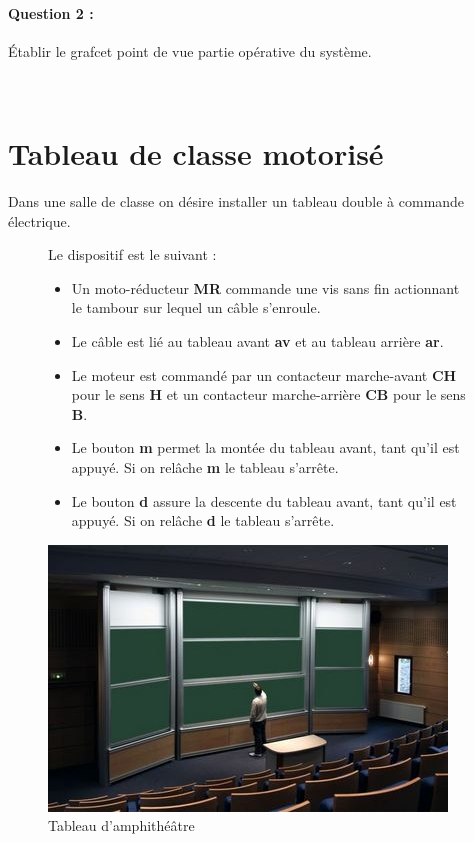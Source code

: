 \paragraph{Question 2 :} Établir le grafcet point de vue partie opérative du système.

\newpage

~\

\newpage

\section{Tableau de classe motorisé}

Dans une salle de classe on désire installer un tableau double à commande électrique.

\begin{figure}[!h]
\begin{minipage}{0.55\linewidth}
Le dispositif est le suivant :
\begin{itemize}
 \item Un moto-réducteur \textbf{MR} commande une vis sans fin actionnant le tambour sur lequel un câble s'enroule.
 \item Le câble est lié au tableau avant \textbf{av} et au tableau arrière \textbf{ar}.
 \item Le moteur est commandé par un contacteur marche-avant \textbf{CH} pour le sens \textbf{H} et un contacteur marche-arrière \textbf{CB} pour le sens \textbf{B}.
 \item Le bouton \textbf{m} permet la montée du tableau avant, tant qu'il est appuyé. Si on relâche \textbf{m} le tableau s'arrête.
 \item Le bouton \textbf{d} assure la descente du tableau avant, tant qu'il est appuyé. Si on relâche \textbf{d} le tableau s'arrête.
\end{itemize}
\end{minipage}
\hfill
\begin{minipage}{0.4\linewidth}
 \begin{center}
 \includegraphics[width=1\linewidth]{img/Tableau.jpg}
 \end{center}
 \caption{Tableau d'amphithéâtre}
 \label{img5}
 \end{minipage}
\end{figure}

